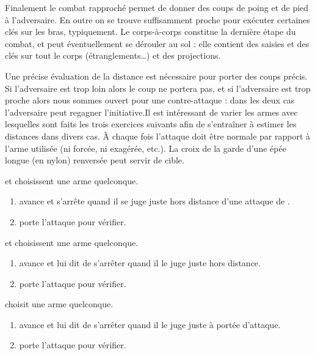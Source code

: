Finalement le combat rapproché permet de donner des coups de poing et de pied à l'adversaire.
En outre on se trouve suffisamment proche pour exécuter certaines clés sur les bras, typiquement.
Le corps-à-corps constitue la dernière étape du combat, et peut éventuellement se dérouler au sol : elle contient des saisies et des clés sur tout le corps (étranglements…) et des projections.

Une précise évaluation de la distance est nécessaire pour porter des coups précis.
Si l'adversaire est trop loin alors le coup ne portera pas, et si l'adversaire est trop proche alors nous sommes ouvert pour une contre-attaque : dans les deux cas l'adversaire peut regagner l'initiative.Il est intéressant de varier les armes avec lesquelles sont faits les trois exercices suivants afin de s'entraîner à estimer les distances dans divers cas.
À chaque fois l'attaque doit être normale par rapport à l'arme utilisée (ni forcée, ni exagérée, etc.).
La croix de la garde d'une épée longue (en nylon) renversée peut servir de cible.


\begin{exercice}
\A et \D choisissent une arme quelconque.

\begin{enumerate}
	\item \A avance et s'arrête quand il se juge juste hors distance d'une attaque de \D.
	
	\item \D porte l'attaque pour vérifier.
\end{enumerate}

\end{exercice}


\begin{exercice}
\A et \D choisissent une arme quelconque.

\begin{enumerate}
	\item \A avance et \D lui dit de s'arrêter quand il le juge juste hors distance.
	
	\item \A porte l'attaque pour vérifier.
\end{enumerate}

\end{exercice}


\begin{exercice}
\A choisit une arme quelconque.

\begin{enumerate}
	\item \D avance et \A lui dit de s'arrêter quand il le juge juste à portée d'attaque.
	
	\item \A porte l'attaque pour vérifier.
\end{enumerate}

\end{exercice}


